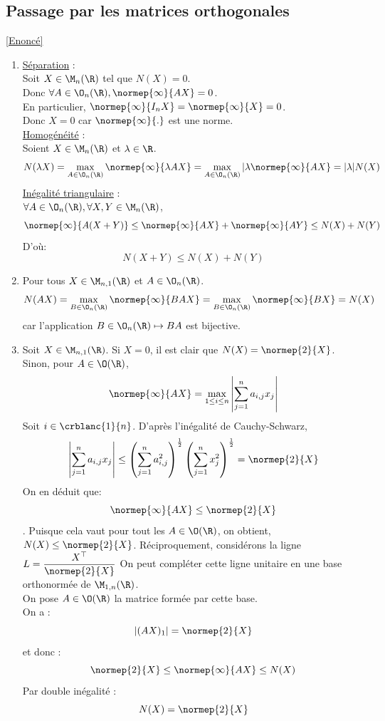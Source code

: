 \documentclass{book}
\begin{document}
		
	\subsection{Passage par les matrices orthogonales}\label{sec:passage-par-les-matrices-orthogonales}
		\textcolor{blue}{\hyperref[Passage par les matrices orthogonales]{[Enoncé]}}\\
	\begin{enumerate}[leftmargin=*]
		\item \textbullet\underline{Séparation} : \\
		Soit $X\in\M_n(\R)$ tel que $N(X)=0$.\\
		Donc $\forall A\in\O_n(\R), \normep{\infty}{AX}=0$.\\
		En particulier, $\normep{\infty}{I_nX}=\normep{\infty}{X}=0$.\\
		Donc $X=0$ car $\normep{\infty}{.}$ est une norme.\\
		\textbullet \underline{Homogénéité} :\\
		Soient $X\in\M_n(\R)$ et $\lambda\in\R$.
		\[N(\lambda X)=\max_{A\in\O_n(\R)}\normep{\infty}{\lambda AX}=\max_{A\in\O_n(\R)}|\lambda\normep{\infty}{AX}=|\lambda|N(X)\]
		\textbullet \underline{Inégalité triangulaire} : \\
		$\forall A\in\O_n(\R), \forall X,Y\in\M_n(\R)$, 
		\[\normep{\infty}{A(X+Y)}\leq \normep{\infty}{AX}+\normep{\infty}{AY}\leq N(X)+N(Y)\]
		D'où: \[N(X+Y)\leq N(X)+N(Y)\]
		\item Pour tous $X\in\M_{n,1}(\R)$ et $A\in\O_n(\R)$.\\
		\[N(AX)=\max_{B\in\O_n(\R)}\normep{\infty}{BAX}= \max_{B\in\O_n(\R)}\normep{\infty}{BX}=N(X)\]
		car l'application $B\in\O_n(\R)\mapsto BA$ est bijective.
		\item Soit $X\in\M_{n,1}(\R)$.
		Si $X=0$, il est clair que $N(X)=\normep{2}{X}$.\\
		Sinon, pour $A\in\O(\R)$, \[\normep{\infty}{AX}=\max_{1\leq i\leq n}\left|\sum_{j=1}^{n}a_{i,j}x_j\right|\]
		Soit $i\in\crblanc{1}{n}$. D'après l'inégalité de Cauchy-Schwarz,
		\[\left|\sum_{j=1}^{n}a_{i,j}x_j\right|\leq\left(\sum_{j=1}^{n}a_{i,j}^2\right)^{\frac{1}{2}}\left(\sum_{j=1}^{n}x_j^2\right)^{\frac{1}{2}}=\normep{2}{X}\]
		On en déduit que: \[\normep{\infty}{AX}\leq\normep{2}{X}\].
		Puisque cela vaut pour tout les $A\in\O(\R)$, on obtient, $N(X)\leq \normep{2}{X}$.
		Réciproquement, considérons la ligne $\displaystyle L=\frac{X^\top}{\normep{2}{X}}$
		On peut compléter cette ligne unitaire en une base orthonormée de $\M_{1,n}(\R)$.\\
		On pose $A\in\O(\R)$ la matrice formée par cette base.\\
		On a : \[|(AX)_1|=\normep{2}{X}\]
		et donc : \[\normep{2}{X}\leq\normep{\infty}{AX}\leq N(X)\]
		Par double inégalité : \[N(X)=\normep{2}{X}\]
	\end{enumerate}
\end{document}
